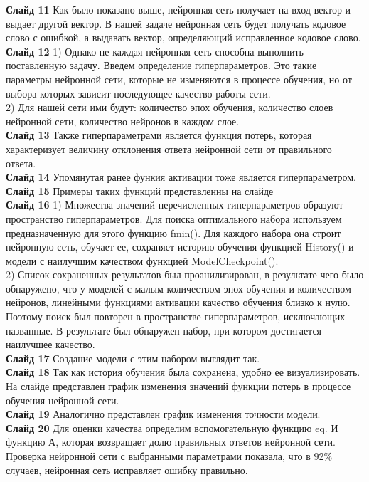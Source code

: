 \documentclass[a4paper]{article}
\begin{document}
\textbf{Слайд 11}
Как было показано выше, нейронная сеть получает на вход вектор и выдает другой вектор. В нашей задаче нейронная сеть будет получать кодовое слово с ошибкой, а выдавать вектор, определяющий исправленное кодовое слово.\\

\textbf{Слайд 12}
1) Однако не каждая нейронная сеть способна выполнить поставленную задачу. Введем определение гиперпараметров. Это такие параметры нейронной сети, которые не изменяются в процессе обучения, но от выбора которых зависит последующее качество работы сети. \\
2) Для нашей сети ими будут: количество эпох обучения, количество слоев нейронной сети, количество нейронов в каждом слое.\\

\textbf{Слайд 13}
Также гиперпараметрами является функция потерь, которая характеризует величину отклонения ответа нейронной сети от правильного ответа.\\

\textbf{Слайд 14}
Упомянутая ранее функия активации тоже является гиперпараметром.\\

\textbf{Слайд 15}
Примеры таких функций представленны на слайде\\

\textbf{Слайд 16}
1) Множества значений перечисленных гиперпараметров образуют пространство гиперпараметров. Для поиска оптимального набора используем предназначенную для этого функцию fmin(). Для каждого набора она строит нейронную сеть, обучает ее, сохраняет историю обучения функцией History() и модели с наилучшим качеством функцией ModelCheckpoint().\\
2) Список сохраненных результатов был проанилизирован, в результате чего было обнаружено, что у моделей с малым количеством эпох обучения и количеством нейронов, линейными функциями активации качество обучения близко к нулю. Поэтому поиск был повторен в пространстве гиперпараметров, исключающих названные. В результате был обнаружен набор, при котором достигается наилучшее качество.\\

\textbf{Слайд 17}
Создание модели с этим набором выглядит так.\\

\textbf{Слайд 18}
Так как история обучения была сохранена, удобно ее визуализировать. На слайде представлен график изменения значений функции потерь в процессе обучения нейронной сети.\\

\textbf{Слайд 19}
Аналогично представлен график изменения точности модели.\\

\textbf{Слайд 20}
Для оценки качества определим вспомогательную функцию eq. И функцию А, которая возвращает долю правильных ответов нейронной сети. Проверка нейронной сети с выбранными параметрами показала, что в 92\% случаев, нейронная сеть исправляет ошибку правильно.
\end{document}
